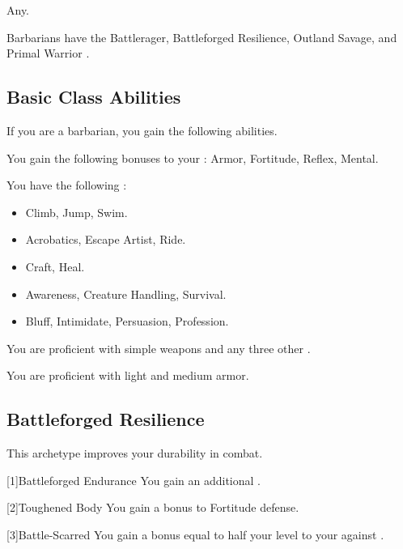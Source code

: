      Any.

     Barbarians have the Battlerager, Battleforged Resilience, Outland Savage, and Primal Warrior .

    \subsection{Basic Class Abilities}
        If you are a barbarian, you gain the following abilities.

        You gain the following bonuses to your :  Armor,  Fortitude,  Reflex,  Mental.

        You have the following :
        \begin{itemize}
            \item {} Climb, Jump, Swim.
            \item {} Acrobatics, Escape Artist, Ride.
            \item {} Craft, Heal.
            \item {} Awareness, Creature Handling, Survival.
            \item {} Bluff, Intimidate, Persuasion, Profession.
        \end{itemize}

        You are proficient with simple weapons and any three other .

        You are proficient with light and medium armor.

    \subsection{Battleforged Resilience}
        This archetype improves your durability in combat.

        [1]{Battleforged Endurance} You gain an additional .

        [2]{Toughened Body} You gain a  bonus to Fortitude defense.

        [3]{Battle-Scarred} You gain a bonus equal to half your level to your  against .

